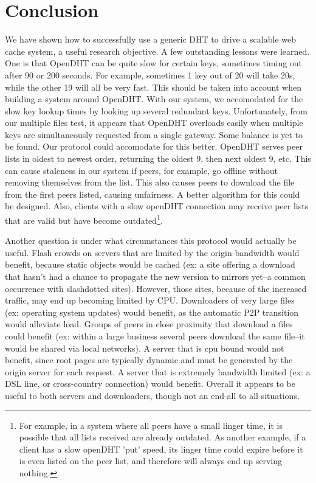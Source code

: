 \section{Conclusion}

We have shown how to successfully use a generic DHT to drive a scalable web cache system, a useful research objective.  
A few outstanding lessons were learned.  One is that OpenDHT can be quite slow for certain keys, sometimes timing out after 90 or 200 seconds.  For example, sometimes 1 key out of 20 will take 20s, while the other 19 will all be very fast.  This should be taken into account when building a system around OpenDHT.  With our system, we accomodated for the slow key lookup times by looking up several redundant keys.  Unfortunately, from our multiple files test, it appears that OpenDHT overloads easily when multiple keys are simultaneously requested from a single gateway.  Some balance is yet to be found.  Our protocol could accomodate for this better.  OpenDHT serves peer lists in oldest to newest order, returning the oldest 9, then next oldest 9, etc.  This can cause staleness in our system if peers, for example, go offline without removing themselves from the list.  This also causes peers to download the file from the first peers listed, causing unfairness\cite{Brian_Thesis}.  A better algorithm for this could be designed.  Also, clients with a slow openDHT connection may receive peer lists that are valid but have become outdated\footnote{For example, in a system where all peers have a small linger time, it is possible that all lists received are already outdated.  As another example, if a client has a slow openDHT 'put' speed, its linger time could expire before it is even listed on the peer list, and therefore will always end up serving nothing.}.

Another question is under what circumstances this protocol would actually be useful.  Flash crowds on servers that are limited by the origin bandwidth would benefit, because static objects would be cached (ex: a site offering a download that hasn't had a chance to propagate the new version to mirrors yet--a common occurrence with slashdotted sites).  However, those sites, because of the increased traffic, may end up becoming limited by CPU.  Downloaders of very large files (ex: operating system updates) would benefit, as the automatic P2P transition would alleviate load.  Groups of peers in close proximity that download a files could benefit (ex: within a large business several peers download the same file--it would be shared via local networks).  A server that is cpu bound would not benefit, since root pages are typically dynamic and must be generated by the origin server for each request.  A server that is extremely bandwidth limited (ex: a DSL line, or cross-country connection) would benefit.  Overall it appears to be useful to both servers and downloaders, though not an end-all to all situations.


